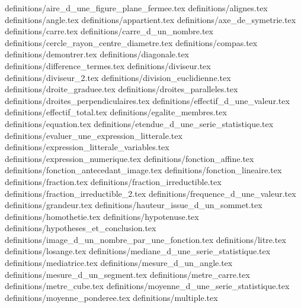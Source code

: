 \catalogues@enonce definitions/aire_d_une_figure_plane_fermee.tex
\catalogues@enonce definitions/alignes.tex
\catalogues@enonce definitions/angle.tex
\catalogues@enonce definitions/appartient.tex
\catalogues@enonce definitions/axe_de_symetrie.tex
\catalogues@enonce definitions/carre.tex
\catalogues@enonce definitions/carre_d_un_nombre.tex
\catalogues@enonce definitions/cercle_rayon_centre_diametre.tex
\catalogues@enonce definitions/compas.tex
\catalogues@enonce definitions/demontrer.tex
\catalogues@enonce definitions/diagonale.tex
\catalogues@enonce definitions/difference_termes.tex
\catalogues@enonce definitions/diviseur.tex
\catalogues@enonce definitions/diviseur_2.tex
\catalogues@enonce definitions/division_euclidienne.tex
\catalogues@enonce definitions/droite_graduee.tex
\catalogues@enonce definitions/droites_paralleles.tex
\catalogues@enonce definitions/droites_perpendiculaires.tex
\catalogues@enonce definitions/effectif_d_une_valeur.tex
\catalogues@enonce definitions/effectif_total.tex
\catalogues@enonce definitions/egalite_membres.tex
\catalogues@enonce definitions/equation.tex
\catalogues@enonce definitions/etendue_d_une_serie_statistique.tex
\catalogues@enonce definitions/evaluer_une_expression_litterale.tex
\catalogues@enonce definitions/expression_litterale_variables.tex
\catalogues@enonce definitions/expression_numerique.tex
\catalogues@enonce definitions/fonction_affine.tex
\catalogues@enonce definitions/fonction_antecedant_image.tex
\catalogues@enonce definitions/fonction_lineaire.tex
\catalogues@enonce definitions/fraction.tex
\catalogues@enonce definitions/fraction_irreductible.tex
\catalogues@enonce definitions/fraction_irreductible_2.tex
\catalogues@enonce definitions/frequence_d_une_valeur.tex
\catalogues@enonce definitions/grandeur.tex
\catalogues@enonce definitions/hauteur_issue_d_un_sommet.tex
\catalogues@enonce definitions/homothetie.tex
\catalogues@enonce definitions/hypotenuse.tex
\catalogues@enonce definitions/hypotheses_et_conclusion.tex
\catalogues@enonce definitions/image_d_un_nombre_par_une_fonction.tex
\catalogues@enonce definitions/litre.tex
\catalogues@enonce definitions/losange.tex
\catalogues@enonce definitions/mediane_d_une_serie_statistique.tex
\catalogues@enonce definitions/mediatrice.tex
\catalogues@enonce definitions/mesure_d_un_angle.tex
\catalogues@enonce definitions/mesure_d_un_segment.tex
\catalogues@enonce definitions/metre_carre.tex
\catalogues@enonce definitions/metre_cube.tex
\catalogues@enonce definitions/moyenne_d_une_serie_statistique.tex
\catalogues@enonce definitions/moyenne_ponderee.tex
\catalogues@enonce definitions/multiple.tex
